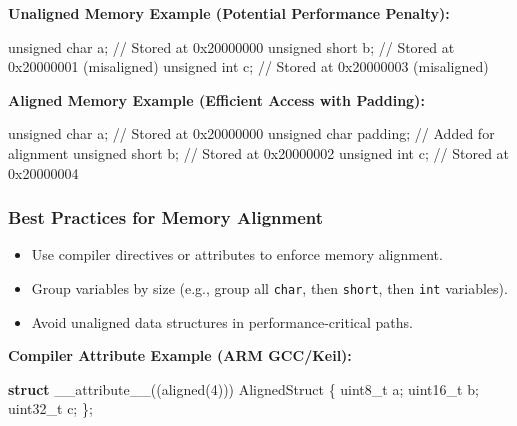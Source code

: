 \documentclass[
  9pt,
  letterpaper,
  abstract,
  titlepage]{scrbook}
\newenvironment{Shaded}{\begin{snugshade}}{\end{snugshade}}
\newcommand{\CommentTok}[1]{\textcolor[rgb]{0.37,0.37,0.37}{#1}}
\newcommand{\DataTypeTok}[1]{\textcolor[rgb]{0.68,0.00,0.00}{#1}}
\newcommand{\DecValTok}[1]{\textcolor[rgb]{0.68,0.00,0.00}{#1}}
\newcommand{\KeywordTok}[1]{\textcolor[rgb]{0.00,0.23,0.31}{\textbf{#1}}}
\newcommand{\NormalTok}[1]{\textcolor[rgb]{0.00,0.23,0.31}{#1}}
\newcommand{\OperatorTok}[1]{\textcolor[rgb]{0.37,0.37,0.37}{#1}}
\begin{document}
\textbf{Unaligned Memory Example (Potential Performance Penalty):}

\begin{Shaded}
\begin{Highlighting}[]
\DataTypeTok{unsigned} \DataTypeTok{char}\NormalTok{ a}\OperatorTok{;}       \CommentTok{// Stored at 0x20000000}
\DataTypeTok{unsigned} \DataTypeTok{short}\NormalTok{ b}\OperatorTok{;}      \CommentTok{// Stored at 0x20000001 (misaligned)}
\DataTypeTok{unsigned} \DataTypeTok{int}\NormalTok{ c}\OperatorTok{;}        \CommentTok{// Stored at 0x20000003 (misaligned)}
\end{Highlighting}
\end{Shaded}

\textbf{Aligned Memory Example (Efficient Access with Padding):}

\begin{Shaded}
\begin{Highlighting}[]
\DataTypeTok{unsigned} \DataTypeTok{char}\NormalTok{ a}\OperatorTok{;}       \CommentTok{// Stored at 0x20000000}
\DataTypeTok{unsigned} \DataTypeTok{char}\NormalTok{ padding}\OperatorTok{;} \CommentTok{// Added for alignment}
\DataTypeTok{unsigned} \DataTypeTok{short}\NormalTok{ b}\OperatorTok{;}      \CommentTok{// Stored at 0x20000002}
\DataTypeTok{unsigned} \DataTypeTok{int}\NormalTok{ c}\OperatorTok{;}        \CommentTok{// Stored at 0x20000004}
\end{Highlighting}
\end{Shaded}

\subsubsection{Best Practices for Memory
Alignment}\label{best-practices-for-memory-alignment}

\begin{itemize}
\item
  Use compiler directives or attributes to enforce memory alignment.
\item
  Group variables by size (e.g., group all \texttt{char}, then
  \texttt{short}, then \texttt{int} variables).
\item
  Avoid unaligned data structures in performance-critical paths.
\end{itemize}

\textbf{Compiler Attribute Example (ARM GCC/Keil):}

\begin{Shaded}
\begin{Highlighting}[]
\KeywordTok{struct}\NormalTok{ \_\_attribute\_\_}\OperatorTok{((}\NormalTok{aligned}\OperatorTok{(}\DecValTok{4}\OperatorTok{)))}\NormalTok{ AlignedStruct }\OperatorTok{\{}
    \DataTypeTok{uint8\_t}\NormalTok{ a}\OperatorTok{;}
    \DataTypeTok{uint16\_t}\NormalTok{ b}\OperatorTok{;}
    \DataTypeTok{uint32\_t}\NormalTok{ c}\OperatorTok{;}
\OperatorTok{\};}
\end{Highlighting}
\end{Shaded}
\end{document}
